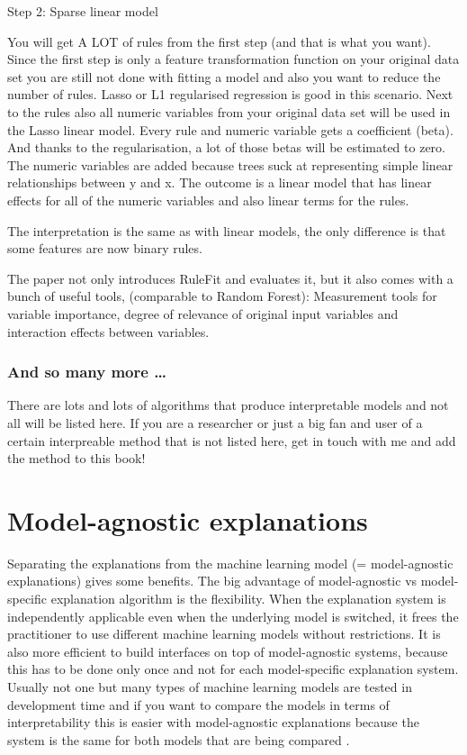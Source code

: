 \documentclass[12pt,]{krantz}
\theoremstyle{definition}
\theoremstyle{definition}
\theoremstyle{definition}
\theoremstyle{remark}
\begin{document}
Step 2: Sparse linear model

You will get A LOT of rules from the first step (and that is what you
want). Since the first step is only a feature transformation function on
your original data set you are still not done with fitting a model and
also you want to reduce the number of rules. Lasso or L1 regularised
regression is good in this scenario. Next to the rules also all numeric
variables from your original data set will be used in the Lasso linear
model. Every rule and numeric variable gets a coefficient (beta). And
thanks to the regularisation, a lot of those betas will be estimated to
zero. The numeric variables are added because trees suck at representing
simple linear relationships between y and x. The outcome is a linear
model that has linear effects for all of the numeric variables and also
linear terms for the rules.

The interpretation is the same as with linear models, the only
difference is that some features are now binary rules.

The paper not only introduces RuleFit and evaluates it, but it also
comes with a bunch of useful tools, (comparable to Random Forest):
Measurement tools for variable importance, degree of relevance of
original input variables and interaction effects between variables.

\subsection{And so many more \ldots{}}\label{and-so-many-more}

There are lots and lots of algorithms that produce interpretable models
and not all will be listed here. If you are a researcher or just a big
fan and user of a certain interpreable method that is not listed here,
get in touch with me and add the method to this book!

\chapter{Model-agnostic explanations}\label{model-agnostic-explanations}

Separating the explanations from the machine learning model (=
model-agnostic explanations) gives some benefits. The big advantage of
model-agnostic vs model-specific explanation algorithm is the
flexibility. When the explanation system is independently applicable
even when the underlying model is switched, it frees the practitioner to
use different machine learning models without restrictions. It is also
more efficient to build interfaces on top of model-agnostic systems,
because this has to be done only once and not for each model-specific
explanation system. Usually not one but many types of machine learning
models are tested in development time and if you want to compare the
models in terms of interpretability this is easier with model-agnostic
explanations because the system is the same for both models that are
being compared \citep{Ribeiro2016b}.
\end{document}
